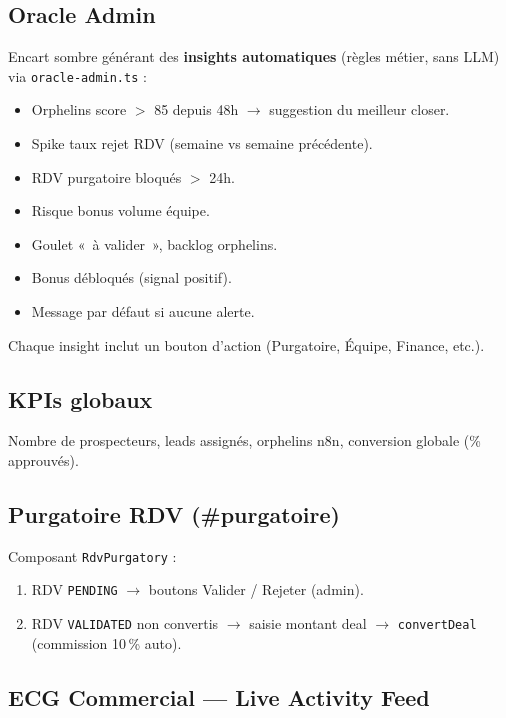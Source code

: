 \documentclass[11pt,a4paper]{report}
\begin{document}
\subsection{Oracle Admin}

Encart sombre générant des \textbf{insights automatiques} (règles métier, sans LLM) via \texttt{oracle-admin.ts} :

\begin{itemize}[noitemsep]
  \item Orphelins score $>$ 85 depuis 48h $\rightarrow$ suggestion du meilleur closer.
  \item Spike taux rejet RDV (semaine vs semaine précédente).
  \item RDV purgatoire bloqués $>$ 24h.
  \item Risque bonus volume équipe.
  \item Goulet «~à valider~», backlog orphelins.
  \item Bonus débloqués (signal positif).
  \item Message par défaut si aucune alerte.
\end{itemize}

Chaque insight inclut un bouton d'action (Purgatoire, Équipe, Finance, etc.).

\subsection{KPIs globaux}

Nombre de prospecteurs, leads assignés, orphelins n8n, conversion globale (\% approuvés).

\subsection{Purgatoire RDV (\#purgatoire)}

Composant \texttt{RdvPurgatory} :
\begin{enumerate}[noitemsep]
  \item RDV \texttt{PENDING} $\rightarrow$ boutons Valider / Rejeter (admin).
  \item RDV \texttt{VALIDATED} non convertis $\rightarrow$ saisie montant deal $\rightarrow$ \texttt{convertDeal} (commission 10\,\% auto).
\end{enumerate}

\subsection{ECG Commercial --- Live Activity Feed}
\end{document}
